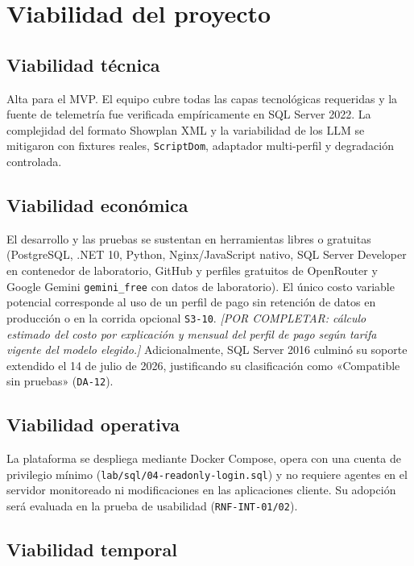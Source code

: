 \documentclass[12pt,a4paper]{article}
\begin{document}
\section{Viabilidad del proyecto}

\subsection{Viabilidad técnica}

Alta para el MVP. El equipo cubre todas las capas tecnológicas requeridas y la fuente de telemetría fue verificada empíricamente en SQL Server 2022. La complejidad del formato Showplan XML y la variabilidad de los LLM se mitigaron con fixtures reales, \texttt{ScriptDom}, adaptador multi-perfil y degradación controlada.

\subsection{Viabilidad económica}

El desarrollo y las pruebas se sustentan en herramientas libres o gratuitas (PostgreSQL, .NET 10, Python, Nginx/JavaScript nativo, SQL Server Developer en contenedor de laboratorio, GitHub y perfiles gratuitos de OpenRouter y Google Gemini \texttt{gemini\_free} con datos de laboratorio). El único costo variable potencial corresponde al uso de un perfil de pago sin retención de datos en producción o en la corrida opcional \texttt{S3-10}. \textit{[POR COMPLETAR: cálculo estimado del costo por explicación y mensual del perfil de pago según tarifa vigente del modelo elegido.]} Adicionalmente, SQL Server 2016 culminó su soporte extendido el 14 de julio de 2026, justificando su clasificación como «Compatible sin pruebas» (\texttt{DA-12}).

\subsection{Viabilidad operativa}

La plataforma se despliega mediante Docker Compose, opera con una cuenta de privilegio mínimo (\texttt{lab/sql/04-readonly-login.sql}) y no requiere agentes en el servidor monitoreado ni modificaciones en las aplicaciones cliente. Su adopción será evaluada en la prueba de usabilidad (\texttt{RNF-INT-01/02}).

\subsection{Viabilidad temporal}
\end{document}
